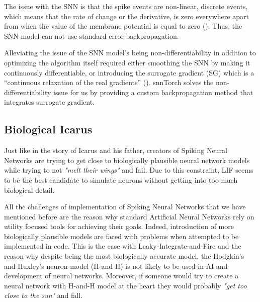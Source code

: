 The issue with the SNN is that the spike events are non-linear, discrete events, which means that the rate of change or the derivative, is zero everywhere apart from when the value of the membrane potential is equal to zero (). Thus, the SNN model can not use standard error backpropagation.

Alleviating the issue of the SNN model’s being non-differentiability in addition to optimizing the algorithm itself required either smoothing the SNN by making it continuously differentiable, or introducing the surrogate gradient (SG) which is a “continuous relaxation of the real gradients” (). snnTorch solves the non-differentiability issue for us by providing a custom backpropagation method that integrates surrogate gradient. 

\subsection{Biological Icarus}

Just like in the story of Icarus and his father, creators of Spiking Neural Networks are trying to get close to biologically plausible neural network models while trying to not \textit{"melt their wings"} and fail. Due to this constraint, LIF seems to be the best candidate to simulate neurons without getting into too much biological detail.

All the challenges of implementation of Spiking Neural Networks that we have mentioned before are the reason why standard Artificial Neural Networks rely on utility focused tools for achieving their goals. Indeed, introduction of more biologically plausible models are faced with problems when attempted to be implemented in code. This is the case with Leaky-Integrate-and-Fire and the reason why despite being the most biologically accurate model, the Hodgkin's and Huxley's neuron model (H-and-H) is not likely to be used in AI and development of neural networks. Moreover, if someone would try to create a neural network with H-and-H model at the heart they would probably \textit{"get too close to the sun"} and fall.